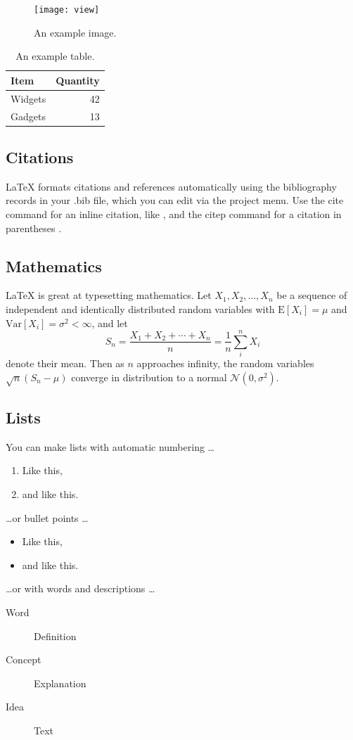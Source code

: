 \documentclass[fleqn,10pt,lineno]{wlpeerj} %
\begin{document}
\begin{figure}[ht]
\centering
\texttt{[image: view]}
\caption{An example image.}
\label{fig:view}
\end{figure}

\begin{table}[ht]
\centering
\begin{tabular}{l|r}
Item & Quantity \\\hline
Widgets & 42 \\
Gadgets & 13
\end{tabular}
\caption{\label{tab:widgets}An example table.}
\end{table}

\subsection*{Citations}

LaTeX formats citations and references automatically using the bibliography records in your .bib file, which you can edit via the project menu. Use the cite command for an inline citation, like \cite{Figueredo:2009dg}, and the citep command for a citation in parentheses \citep{Figueredo:2009dg}.

\subsection*{Mathematics}

\LaTeX{} is great at typesetting mathematics. Let $X_1, X_2, \ldots, X_n$ be a sequence of independent and identically distributed random variables with $\text{E}[X_i] = \mu$ and $\text{Var}[X_i] = \sigma^2 < \infty$, and let
$$S_n = \frac{X_1 + X_2 + \cdots + X_n}{n}
      = \frac{1}{n}\sum_{i}^{n} X_i$$
denote their mean. Then as $n$ approaches infinity, the random variables $\sqrt{n}(S_n - \mu)$ converge in distribution to a normal $\mathcal{N}(0, \sigma^2)$.

\subsection*{Lists}

You can make lists with automatic numbering \dots

\begin{enumerate}[noitemsep] 
\item Like this,
\item and like this.
\end{enumerate}
\dots or bullet points \dots
\begin{itemize}[noitemsep] 
\item Like this,
\item and like this.
\end{itemize}
\dots or with words and descriptions \dots
\begin{description}
\item[Word] Definition
\item[Concept] Explanation
\item[Idea] Text
\end{description}
\end{document}
